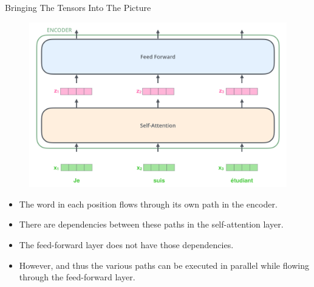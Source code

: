 \documentclass[handout]{beamer}
\begin{document}
\begin{frame}{Bringing The Tensors Into The Picture}
\begin{scriptsize}

\begin{figure}[h]
        	\includegraphics[scale = 0.2]{pics/encoder_with_tensors.png}
        \end{figure}  

\begin{itemize}


\item The word in each position flows through its own path in the encoder. 

\item There are dependencies between these paths in the self-attention layer. 

\item The feed-forward layer does not have those dependencies.

\item However, and thus the various paths can be executed in parallel while flowing through the feed-forward layer.


\end{itemize}

\end{scriptsize}


\end{frame}
\end{document}

